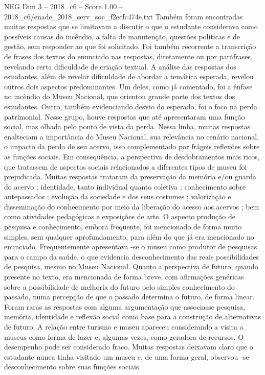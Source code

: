 \begin{textsample}{NEG Dim 3 – 2018\_c6 – Score 1.00 – 2018\_c6/enade\_2018\_serv\_soc\_f2ecfc474e.txt}
Também foram encontradas muitas respostas que se limitavam a discutir o que o estudante considerava como possíveis causas do incêndio, a falta de manutenção, questões políticas e de gestão, sem responder ao que foi solicitado.
Foi também recorrente a transcrição de frases dos textos do enunciado nas respostas, diretamente ou por paráfrases, revelando certa dificuldade de criação textual.
A análise das respostas dos estudantes, além de revelar dificuldade de abordar a temática esperada, revelou outros dois aspectos predominantes.
Um deles, como já comentado, foi a ênfase no incêndio do Museu Nacional, que orientou grande parte dos textos dos estudantes.
Outro, também evidenciando desvio do esperado, foi o foco na perda patrimonial.
Nesse grupo, houve respostas que até apresentaram uma função social, mas olhada pelo ponto de vista da perda.
Nessa linha, muitas respostas enalteciam a importância do Museu Nacional, sua relevância no cenário nacional, o impacto da perda de seu acervo, isso complementado por frágeis reflexões sobre as funções sociais.
Em consequência, a perspectiva de desdobramentos mais ricos, que tratassem de aspectos sociais relacionados a diferentes tipos de museu foi prejudicada.
Muitas respostas trataram da preservação da memória e/ou guarda do acervo ; identidade, tanto individual quanto coletiva ; conhecimento sobre antepassados ; evolução da sociedade e dos seus costumes ; valorização e disseminação do conhecimento por meio da liberação do acesso aos acervos ; bem como atividades pedagógicas e exposições de arte.
O aspecto produção de pesquisa e conhecimento, embora frequente, foi mencionado de forma muito simples, sem qualquer aprofundamento, para além do que já era mencionado no enunciado.
Frequentemente apresentava -se o museu como produtor de pesquisas para o campo da saúde, o que evidencia desconhecimento das reais possibilidades de pesquisa, mesmo no Museu Nacional.
Quanto a perspectiva de futuro, quando presente no texto, era mencionada de forma breve, com afirmações genéricas sobre a possibilidade de melhoria do futuro pelo simples conhecimento do passado, numa percepção de que o passado determina o futuro, de forma linear.
Foram raras as respostas com alguma argumentação que associasse pesquisa, memória, identidade e reflexão social como base para a construção de alternativas de futuro.
A relação entre turismo e museu apareceu considerando a visita a museus como forma de lazer e, algumas vezes, como geradora de recursos.
O desempenho pode ser considerado fraco.
Muitas respostas deixavam claro que o estudante nunca tinha visitado um museu e, de uma forma geral, observou -se desconhecimento sobre suas funções sociais.

\end{textsample}
